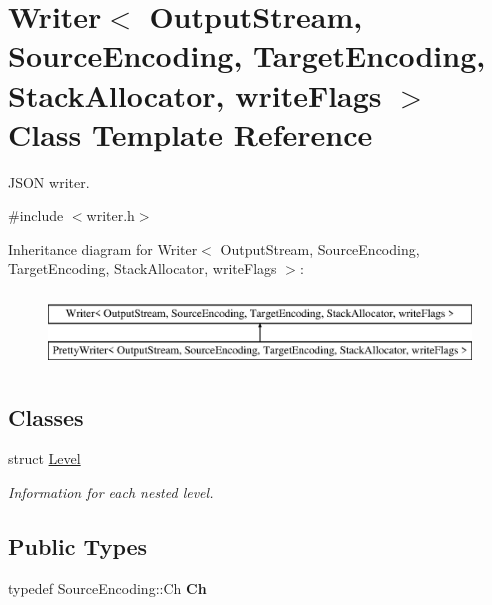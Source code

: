 \hypertarget{a00335}{}\section{Writer$<$ Output\+Stream, Source\+Encoding, Target\+Encoding, Stack\+Allocator, write\+Flags $>$ Class Template Reference}
\label{a00335}


J\+S\+ON writer.  




{\ttfamily \#include $<$writer.\+h$>$}

Inheritance diagram for Writer$<$ Output\+Stream, Source\+Encoding, Target\+Encoding, Stack\+Allocator, write\+Flags $>$\+:\begin{figure}[H]
\begin{center}
\leavevmode
\includegraphics[height=2.000000cm]{a00335}
\end{center}
\end{figure}
\subsection*{Classes}
\begin{DoxyCompactItemize}
\item 
struct \hyperlink{a00190}{Level}
\begin{DoxyCompactList}\small\item\em Information for each nested level. \end{DoxyCompactList}\end{DoxyCompactItemize}
\subsection*{Public Types}
\begin{DoxyCompactItemize}
\item 
typedef Source\+Encoding\+::\+Ch {\bfseries Ch}\hypertarget{a00335_ab08bff5fd2daec65f4a78779ca3d2139}{}\label{a00335_ab08bff5fd2daec65f4a78779ca3d2139}

\end{DoxyCompactItemize}
